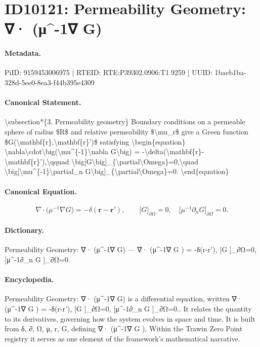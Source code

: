\section*{ID10121: Permeability Geometry: ∇· (μ\textasciicircum{}-1∇ G)}
\paragraph{Metadata.}
PiID: 9159453006975 | RTEID: RTE:P39302.0906:T1.9259 | UUID: 1baeb1ba-328d-5ee0-8ea3-f44b395e4309

\paragraph{Canonical Statement.}
\textbackslash{}subsection*\{3. Permeability geometry\} Boundary conditions on a permeable sphere of radius \$R\$ and relative permeability \$\textbackslash{}mu\_r\$ give a Green function \$G(\textbackslash{}mathbf\{r\},\textbackslash{}mathbf\{r\}')\$ satisfying \textbackslash{}begin\{equation\} \textbackslash{}nabla\textbackslash{}cdot\textbackslash{}big(\textbackslash{}mu\textasciicircum{}\{-1\}\textbackslash{}nabla G\textbackslash{}big) = -\textbackslash{}delta(\textbackslash{}mathbf\{r\}-\textbackslash{}mathbf\{r\}'),\textbackslash{}qquad \textbackslash{}big[G\textbackslash{}big]\_\{\textbackslash{}partial\textbackslash{}Omega\}=0,\textbackslash{}quad \textbackslash{}big[\textbackslash{}mu\textasciicircum{}\{-1\}\textbackslash{}partial\_n G\textbackslash{}big]\_\{\textbackslash{}partial\textbackslash{}Omega\}=0. \textbackslash{}end\{equation\}

\paragraph{Canonical Equation.}
\[
\nabla\cdot\big(\mu^{-1}\nabla G\big) = -\delta(\mathbf{r}-\mathbf{r}'),\qquad \big[G\big]_{\partial\Omega}=0,\quad \big[\mu^{-1}\partial_n G\big]_{\partial\Omega}=0.
\]

\paragraph{Dictionary.}
Permeability Geometry: ∇· (μ\textasciicircum{}-1∇ G) — ∇· (μ\textasciicircum{}-1∇ G ) = -δ(r-r'), [G ]\_∂Ω=0, [μ\textasciicircum{}-1∂\_n G ]\_∂Ω=0.

\paragraph{Encyclopedia.}
Permeability Geometry: ∇· (μ\textasciicircum{}-1∇ G) is a differential equation, written ∇· (μ\textasciicircum{}-1∇ G ) = -δ(r-r'), [G ]\_∂Ω=0, [μ\textasciicircum{}-1∂\_n G ]\_∂Ω=0.. It relates the quantity to its derivatives, governing how the system evolves in space and time. It is built from δ, ∂, Ω, μ, r, G, defining ∇· (μ\textasciicircum{}-1∇ G ). Within the Trawin Zero Point registry it serves as one element of the framework's mathematical narrative.
